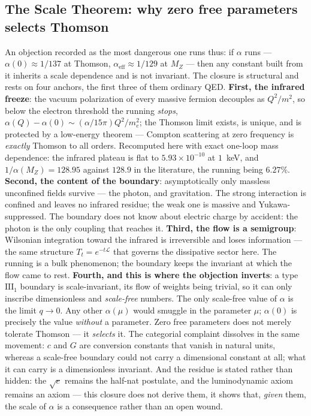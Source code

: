 \documentclass[11pt]{article}
\theoremstyle{definition}\newtheorem{deriv}{Derivation}
\begin{document}
\subsection*{The Scale Theorem: why zero free parameters selects Thomson}An objection recorded as the most dangerous one runs thus: if $\alpha$ runs --- $\alpha(0)\approx 1/137$ at Thomson, $\alpha_{\mathrm{eff}}\approx 1/129$ at $M_Z$ --- then any constant built from it inherits a scale dependence and is not invariant. The closure is structural and rests on four anchors, the first three of them ordinary QED. \textbf{First, the infrared freeze}: the vacuum polarization of every massive fermion decouples as $Q^2/m^2$, so below the electron threshold the running \emph{stops}, $\alpha(Q)-\alpha(0)\sim(\alpha/15\pi)Q^2/m_e^2$; the Thomson limit exists, is unique, and is protected by a low-energy theorem --- Compton scattering at zero frequency is \emph{exactly} Thomson to all orders. Recomputed here with exact one-loop mass dependence: the infrared plateau is flat to $5.93\times10^{-10}$ at $1$~keV, and $1/\alpha(M_Z)=128.95$ against $128.9$ in the literature, the running being $6.27\%$. \textbf{Second, the content of the boundary}: asymptotically only massless unconfined fields survive --- the photon, and gravitation. The strong interaction is confined and leaves no infrared residue; the weak one is massive and Yukawa-suppressed. The boundary does not know about electric charge by accident: the photon is the only coupling that reaches it. \textbf{Third, the flow is a semigroup}: Wilsonian integration toward the infrared is irreversible and loses information --- the same structure $T_t=e^{-t\mathcal{L}}$ that governs the dissipative sector here. The running is a bulk phenomenon; the boundary keeps the invariant at which the flow came to rest. \textbf{Fourth, and this is where the objection inverts}: a type $\mathrm{III}_1$ boundary is scale-invariant, its flow of weights being trivial, so it can only inscribe dimensionless and \emph{scale-free} numbers. The only scale-free value of $\alpha$ is the limit $q\to 0$. Any other $\alpha(\mu)$ would smuggle in the parameter $\mu$; $\alpha(0)$ is precisely the value \emph{without} a parameter. Zero free parameters does not merely tolerate Thomson --- it \emph{selects} it. The categorial complaint dissolves in the same movement: $c$ and $G$ are conversion constants that vanish in natural units, whereas a scale-free boundary could not carry a dimensional constant at all; what it can carry is a dimensionless invariant. And the residue is stated rather than hidden: the $\sqrt{e}$ remains the half-nat postulate, and the luminodynamic axiom remains an axiom --- this closure does not derive them, it shows that, \emph{given} them, the scale of $\alpha$ is a consequence rather than an open wound.
\end{document}
